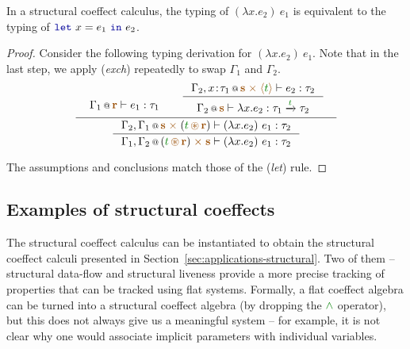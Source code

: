 \begin{remark}
\label{thm:structural-letbinding}
In a structural coeffect calculus, the typing of $(\lambda x.e_2)~e_1$ is equivalent
to the typing of $\kvd{let}~x=e_1~\kvd{in}~e_2$.
\end{remark}
\begin{proof}
Consider the following typing derivation for $(\lambda x.e_2)~e_1$. Note that 
in the last step, we apply (\emph{exch}) repeatedly to swap $\Gamma_1$ and $\Gamma_2$. 
%
\begin{equation*}
\inference
  { \begin{array}{l}\coctx{\Gamma_1}{\aclrd{\textbf{r}}} \vdash e_1 : \tau_1\vspace{-1.6em}\end{array} &
    \inference
      { \coctx{\Gamma_2, x\!:\!\tau_1}{\aclrd{\textbf{s}}\;\atimes\;\alift{\cclrd{t}}} \vdash e_2 : \tau_2 }
      { \coctx{\Gamma_2}{\aclrd{\textbf{s}}} \vdash \lambda x.e_2 : \tau_1 \xrightarrow{\cclrd{t}} \tau_2} \vspace{0.2em} }
  { \inference
      { \coctx{\Gamma_2, \Gamma_1}{\aclrd{\textbf{s}} \;\atimes\; (\cclrd{t} \,\aseq\, \aclrd{\textbf{r}})} \vdash (\lambda x.e_2)~e_1 : \tau_2 }
      { \coctx{\Gamma_1, \Gamma_2}{(\cclrd{t} \,\aseq\, \aclrd{\textbf{r}}) \;\atimes\;  \aclrd{\textbf{s}} } \vdash (\lambda x.e_2)~e_1 : \tau_2 } }
\end{equation*}

\noindent
The assumptions and conclusions match those of the (\emph{let}) rule. 
\end{proof}



\subsection{Examples of structural coeffects}

The structural coeffect calculus can be instantiated to obtain the structural coeffect calculi
presented in Section~\ref{sec:applications-structural}. Two of them -- structural data-flow and
structural liveness provide a more precise tracking of properties that can be tracked using 
flat systems. Formally, a flat coeffect algebra can be turned into a structural coeffect algebra
(by dropping the $\czip$ operator), but this does not always give us a meaningful system -- for
example, it is not clear why one would associate implicit parameters with individual variables.

